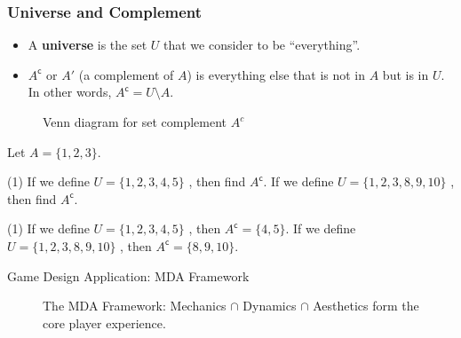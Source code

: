 \begin{frame}
\frametitle{Universe and Complement}
\begin{defn}{}{}
\begin{itemize}
\item A \textbf{universe} is the set $U$ that we consider to be ``everything''. 
\item $A^\mathsf{c}$ or $A'$ (a complement of $A$) is everything else that is not in $A$ but is in $U$. In other words, $A^\mathsf{c} = U \setminus A$.
\end{itemize}
\end{defn}

\begin{figure}[h!]
\centering
{}
\caption{Venn diagram for set complement $A^{c}$}
\end{figure}
\end{frame}


\begin{frame}[t]
\begin{ex}
Let $A = \{1,2,3\}$. 
\begin{tasks}(1)
\task If we define $U = \{1,2,3,4,5\}$ , then find $A^\mathsf{c}$. 
\task If we define $U = \{1,2,3,8,9,10\}$ , then find $A^\mathsf{c}$.
\end{tasks}
\end{ex}
\begin{sol}
\begin{tasks}(1)
\task If we define $U = \{1,2,3,4,5\}$ , then $A^\mathsf{c} = \{4,5\}$. 
\task  If we define $U = \{1,2,3,8,9,10\}$ , then $A^\mathsf{c} = \{8,9,10\}$.
\end{tasks}
\end{sol}
\end{frame}

\begin{frame}{Game Design Application: MDA Framework}
\begin{figure}[h!]
\centering
{}
\caption{The MDA Framework: Mechanics $\cap$ Dynamics $\cap$ Aesthetics form the core player experience.}
\end{figure}
\end{frame}

